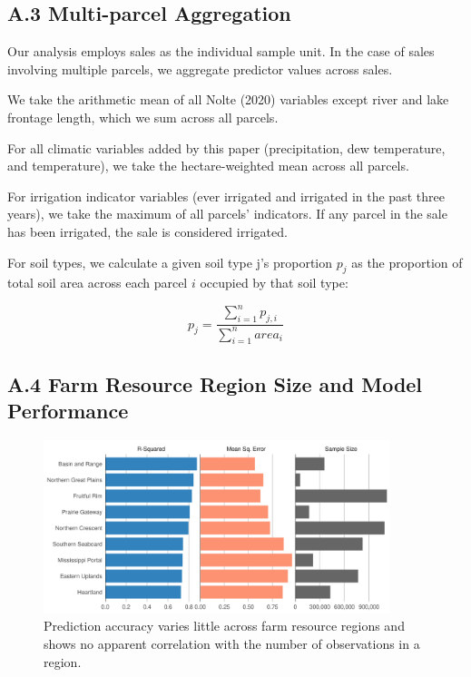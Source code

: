\documentclass[12pt]{article}
\begin{document}
\subsection*{A.3 Multi-parcel Aggregation}
Our analysis employs sales as the individual sample unit. In the case of sales involving multiple parcels, we aggregate predictor values across sales. 

We take the arithmetic mean of all Nolte (2020) variables except river and lake frontage length, which we sum across all parcels.

For all climatic variables added by this paper (precipitation, dew temperature, and temperature), we take the hectare-weighted mean across all parcels.

For irrigation indicator variables (ever irrigated and irrigated in the past three years), we take the maximum of all parcels' indicators. If any parcel in the sale has been irrigated, the sale is considered irrigated.

For soil types, we calculate a given soil type j's proportion $p_j$ as the proportion of total soil area across each parcel $i$ occupied by that soil type:

\[
p_j = \displaystyle\frac{\sum\limits_{i=1}^{n}p_{j,i}}{\sum\limits_{i=1}^{n}area_i}
\]

\newpage

\subsection*{A.4 Farm Resource Region Size and Model Performance}


\begin{figure}[H]
    \centering
    \includegraphics[width=0.9\textwidth]{exhibits/frr_performance_size.png}
    \caption{Prediction accuracy varies little across farm resource regions and shows no apparent correlation with the number of observations in a region.}
    \label{fig:frr_performance_size}
\end{figure}


\newpage

\printbibliography
\end{document}
